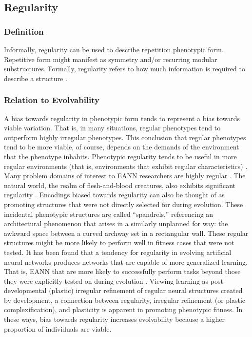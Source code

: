\subsection{Regularity} \label{sec:regularity}
\subsubsection{Definition}
Informally, regularity can be used to describe repetition phenotypic form. Repetitive form might manifest as symmetry and/or recurring  modular substructures. Formally, regularity refers to how much information is required to describe a structure \cite{Clune2011OnRegularity}.

\subsubsection{Relation to Evolvability}
A bias towards regularity in phenotypic form tends to represent a bias towards viable variation.\mindmapmark{\usefulvariationregularity} That is, in many situations, regular phenotypes tend to outperform highly irregular phenotypes. This conclusion that regular phenotypes tend to be more viable, of course, depends on the demands of the environment that the phenotype inhabits. Phenotypic regularity tends to be useful in more regular environments (that is, environments that exhibit regular characteristics) \cite{Clune2011OnRegularity}. Many problem domains of interest to EANN researchers are highly regular \cite{Clune2011OnRegularity}. The natural world, the realm of flesh-and-blood creatures, also exhibits significant regularity \cite[pg 161]{Downing2015IntelligenceSystems}. Encodings biased towards regularity can also be thought of as promoting structures that were not directly selected for during evolution. These incidental phenotypic structures are called ``spandrels,'' referencing an architectural phenomenon that arises in a similarly unplanned for way: the awkward space between a curved archway set in a rectangular wall. These regular structures might be more likely to perform well in fitness cases that were not tested. It has been found that a tendency for regularity in evolving artificial neural networks produces networks that are capable of more generalized learning. That is, EANN that are more likely to successfully perform tasks beyond those they were explicitly tested on during evolution \cite{Tonelli2013OnNetworks}. Viewing learning as post-developmental (plastic) irregular refinement of regular neural structures created by development, a connection between regularity, irregular refinement (or plastic complexification), and plasticity is apparent in promoting phenotypic fitness.\mindmapmark{\usefulvariationregularitycomplexificationplasticity}  In these ways, bias towards regularity increases evolvability because a higher proportion of individuals are viable.

